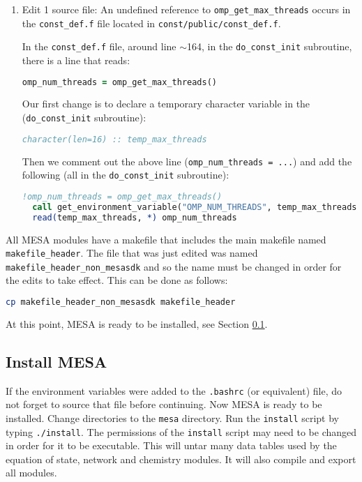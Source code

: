 \begin{enumerate}
\item Edit 1 source file: An undefined reference to 
{\tt omp\_get\_max\_threads} occurs in the {\tt const\_def.f} file located in 
{\tt const/public/const\_def.f}.

In the {\tt const\_def.f} file, around line $\sim$164, in the 
{\tt do\_const\_init} subroutine, there is a line that reads:
\begin{lstlisting}[language=fortran,mathescape=false]
  omp_num_threads = omp_get_max_threads()
\end{lstlisting}
Our first change is to declare a temporary character variable in the 
({\tt do\_const\_init} subroutine):
\begin{lstlisting}[language=fortran,mathescape=false]
  character(len=16) :: temp_max_threads
\end{lstlisting}
Then we comment out the above line ({\tt omp\_num\_threads = ...}) and add the 
following (all in the {\tt do\_const\_init} subroutine):
\begin{lstlisting}[language=fortran,mathescape=false]
  !omp_num_threads = omp_get_max_threads()
  call get_environment_variable("OMP_NUM_THREADS", temp_max_threads)
  read(temp_max_threads, *) omp_num_threads
\end{lstlisting}

\end{enumerate}

All {\sf MESA} modules have a makefile that includes the main makefile named 
{\tt makefile\_header}. The file that was just edited was named 
{\tt makefile\_header\_non\_mesasdk} and so the name must be changed in order 
for the edits to take effect. This can be done as follows:
\begin{lstlisting}[language=bash,mathescape=false]
  cp makefile_header_non_mesasdk makefile_header
\end{lstlisting}

At this point, {\sf MESA} is ready to be installed, see Section 
\ref{sec:install}.


\subsection{Install {\sf MESA}}
\label{sec:install}
If the environment variables were added to the {\tt .bashrc} (or equivalent) 
file, do not forget to source that file before continuing. Now {\sf MESA} 
is ready to be installed. Change directories to the {\tt mesa} directory. 
Run the {\tt install} script by typing {\tt ./install}. The permissions of the 
{\tt install} script may need to be changed in order for it to be executable.
This will untar many data tables used by the equation of state, network and 
chemistry modules. It will also compile and export all modules.

